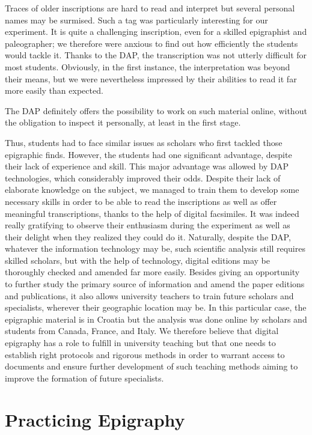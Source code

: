 \documentclass[amsthm,ebook]{saparticle}
\begin{document}
Traces of older inscriptions are hard to read and interpret but several personal names may be surmised. Such a tag was
particularly interesting for our experiment. It is quite a challenging inscription, even for a skilled epigraphist and
paleographer; we therefore were anxious to find out how efficiently the students would tackle it. Thanks to the DAP,
the transcription was not utterly difficult for most students. Obviously, in the first instance, the interpretation was
beyond their means, but we were nevertheless impressed by their abilities to read it far more easily than expected. 

\newpage
The DAP definitely offers the possibility to work on such material online, without the obligation to inspect it personally,
at least in the first stage.


Thus, students had to face similar issues as scholars who first tackled those epigraphic finds. However, the students
had one significant advantage, despite their lack of experience and skill. This major advantage was allowed by DAP
technologies, which considerably improved their odds. Despite their lack of elaborate knowledge on the subject, we
managed to train them to develop some necessary skills in order to be able to read the inscriptions as well as offer
meaningful transcriptions, thanks to the help of digital facsimiles. It was indeed really gratifying to observe their
enthusiasm during the experiment as well as their delight when they realized they could do it. Naturally, despite the
DAP, whatever the information technology may be, such scientific analysis still requires skilled scholars, but with the
help of technology, digital editions may be thoroughly checked and amended far more easily. Besides giving an
opportunity to further study the primary source of information and amend the paper editions and publications, it also
allows university teachers to train future scholars and specialists, wherever their geographic location may be. In this
particular case, the epigraphic material is in Croatia but the analysis was done online by scholars and students from
Canada, France, and Italy. We therefore believe that digital epigraphy has a role to fulfill in university teaching but
that one needs to establish right protocols and rigorous methods in order to warrant access to documents and ensure
further development of such teaching methods aiming to improve the formation of future specialists.


\newpage
\section{Practicing Epigraphy}
\end{document}
